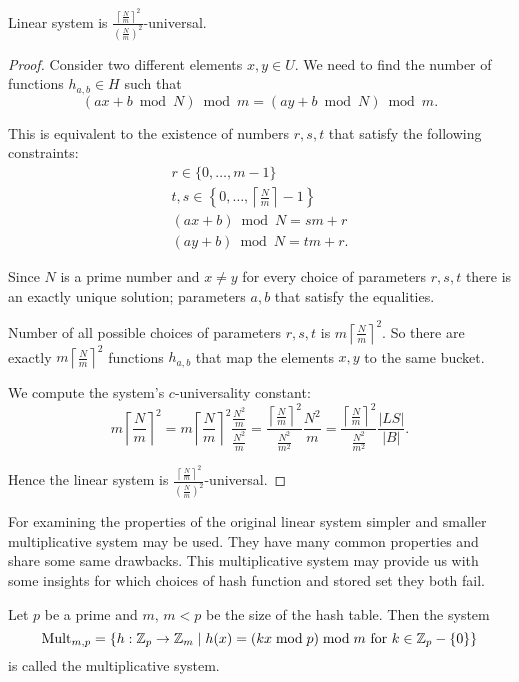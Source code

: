 \begin{remark}
Linear system is $\frac{\left\lceil \frac{N}{m} \right\rceil ^ 2}{\left(\frac{N}{m}\right) ^ 2}$-universal.
\end{remark}
\begin{proof}
Consider two different elements $x, y \in U$. We need to find the number of functions $h_{a, b} \in H$ such that 
\[ (ax + b \bmod N) \bmod m = (ay + b \bmod N) \bmod m \text{.} \]

This is equivalent to the existence of numbers $r, s, t$ that satisfy the following constraints:
\begin{gather*}
r \in \{0, \dots, m - 1 \} \\
t, s \in \left\{ 0, \dots, \left \lceil \frac{N}{m} \right \rceil - 1 \right\} \\
(ax + b) \bmod N = s m + r \\
(ay + b) \bmod N = t m + r \text{.}
\end{gather*}

Since $N$ is a prime number and $x \neq y$ for every choice of parameters $r, s, t$ there is an exactly unique solution; parameters $a, b$ that satisfy the equalities.

Number of all possible choices of parameters $r, s, t$ is $m \left \lceil \frac{N}{m} \right \rceil ^ 2$. So there are exactly $m \left \lceil \frac{N}{m} \right \rceil ^ 2$ functions $h_{a, b}$ that map the elements $x, y$ to the same bucket.

We compute the system's $c$-universality constant:
\[
m \left \lceil \frac{N}{m} \right \rceil ^ 2 = 
m \left \lceil \frac{N}{m} \right \rceil ^ 2 \frac{\frac{N ^ 2}{m}}{\frac{N ^ 2}{m}} = 
\frac{\left \lceil \frac{N}{m} \right \rceil ^ 2}{\frac{N ^ 2}{m ^ 2}} \frac{N ^ 2}{m} = 
\frac{\left \lceil \frac{N}{m} \right \rceil ^ 2}{\frac{N ^ 2}{m ^ 2}} \frac{|LS|}{|B|} \text{.}
\]

Hence the linear system is $\frac{\left \lceil \frac{N}{m} \right \rceil ^ 2}{\left(\frac{N}{m}\right) ^ 2}$-universal.
\end{proof}

For examining the properties of the original linear system simpler and smaller multiplicative system may be used. They have many common properties and share some same drawbacks. This multiplicative system may provide us with some insights for which choices of hash function and stored set they both fail.

\begin{definition}
Let $p$ be a prime and $m$, $m < p$ be the size of the hash table. Then the system \[ \mathrm{Mult}_{m, p} = \lbrace h:\mathbb{Z}_p \rightarrow \mathbb{Z}_m \mid h(x) = (kx \bmod p) \bmod m \text{ for } k \in \mathbb{Z}_p - \{0\} \rbrace \] is called the multiplicative system.
\end{definition}

